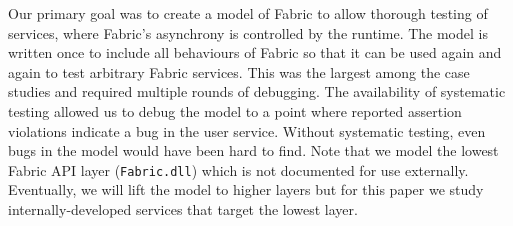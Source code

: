 Our primary goal was to create a \psharp{} model of Fabric to allow
thorough testing of services, where Fabric's asynchrony is controlled 
by the \psharp{} runtime.
The model is written once
to include all behaviours of Fabric
so that it can be used again and again to test arbitrary Fabric services.
This was the largest among the case studies
and required multiple rounds of debugging.
The availability of systematic testing
allowed us to debug the model to
a point where reported assertion violations indicate a bug in the
user service.
Without systematic testing,
even bugs in the model would have been hard to find.
Note that we model the lowest Fabric API layer (\texttt{Fabric.dll})
which is not documented for use externally.
Eventually, we will lift the model
to higher layers
but for this paper we study internally-developed services
that target the lowest layer. 





